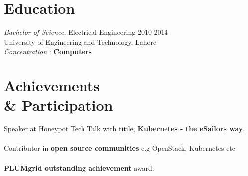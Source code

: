 \documentclass[margin]{res}
\begin{document}
\begin{resume}
\section{Education} {\sl Bachelor of Science,} Electrical Engineering \hfill 2010-2014 \\
                University of Engineering and Technology, Lahore \\
	             \textit{Concentration} : \textbf{Computers}

\section{Achievements \\ \& Participation} Speaker at Honeypot Tech Talk with titile, \textbf{Kubernetes - the eSailors way}. \\ \\
Contributor in \textbf{open source communities} e.g OpenStack, Kubernetes etc \\ \\
\textbf{PLUMgrid outstanding achievement} award. \\ \\
\end{resume}
\end{document}
